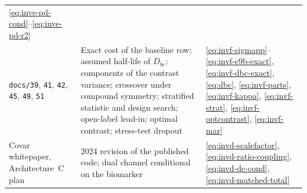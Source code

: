 \documentclass[11pt]{article}
\newcommand{\code}[1]{\texttt{#1}}
\begin{document}
\begin{longtable}{@{}p{2.3cm}p{9.5cm}p{2.3cm}@{}}
  \eqref{eq:inve-pd-cond}--\eqref{eq:inve-pd-r2} \\
\code{docs/39}, \code{41}, \code{42}, \code{45}, \code{49}, \code{51} &
  Exact cost of the baseline row; assumed half-life of $D_{bc}$;
  components of the contrast variance; crossover under compound
  symmetry; stratified statistic and design search; open-label
  lead-in; optimal contrast; stress-test dropout &
  \eqref{eq:invf-sigmapp}--\eqref{eq:invf-e9b-exact},
  \eqref{eq:invf-dbc-exact}, \eqref{eq:dbc},
  \eqref{eq:invf-parts}, \eqref{eq:invf-kappa}, \eqref{eq:invf-strat},
  \eqref{eq:invf-optcontrast}, \eqref{eq:invf-mar} \\
Covar whitepaper, Architecture~C plan & 2024 revision of the
  published code; dual channel conditional on the biomarker &
  \eqref{eq:invd-scalefactor}, \eqref{eq:invd-ratio-coupling},
  \eqref{eq:invd-dc-cond}, \eqref{eq:invd-matched-total} \\
\bottomrule
\end{longtable}
\end{document}
